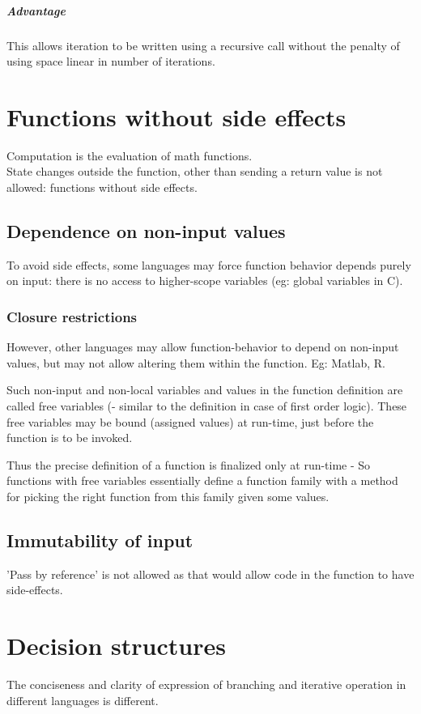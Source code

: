 \documentclass[oneside, article]{memoir}
\begin{document}
\subparagraph{Advantage}
This allows iteration to be written using a recursive call without the penalty of using space linear in number of iterations.

\section{Functions without side effects}
Computation is the evaluation of math functions. \\
State changes outside the function, other than sending a return value is not allowed: functions without side effects.

\subsection{Dependence on non-input values}
To avoid side effects, some languages may force function behavior depends purely on input: there is no access to higher-scope variables (eg: global variables in C).

\subsubsection{Closure restrictions}
However, other languages may allow function-behavior to depend on non-input values, but may not allow altering them within the function. Eg: Matlab, R.

Such non-input and non-local variables and values in the function definition are called free variables (- similar to the definition in case of first order logic). These free variables may be bound (assigned values) at run-time, just before the function is to be invoked.

Thus the precise definition of a function is finalized only at run-time - So functions with free variables essentially define a function family with a method for picking the right function from this family given some values.

\subsection{Immutability of input}
'Pass by reference' is not allowed as that would allow code in the function to have side-effects.

\section{Decision structures}
The conciseness and clarity of expression of branching and iterative operation in different languages is different.
\end{document}

